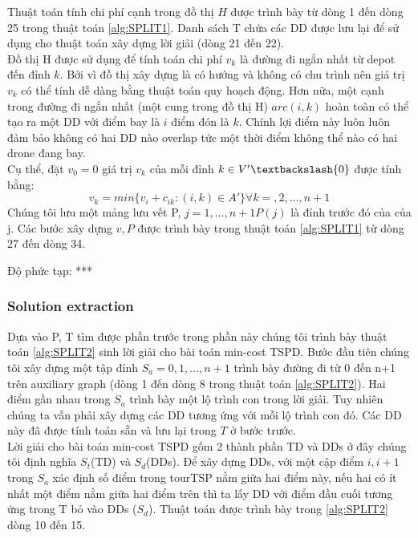 \documentclass[a4paper,12pt]{report}
\begin{document}
Thuật toán tính chi phí cạnh trong đồ thị $H$ được trình bày từ dòng 1 đến dòng 25 trong thuật toán \ref{alg:SPLIT1}. Danh sách T chứa các DD được lưu lại để sử dụng cho thuật toán xây dựng lời giải (dòng 21 đến 22). \\

Đồ thị H được sử dụng để tính toán chi phí $v_k$ là đường đi ngắn nhất từ depot đến đỉnh $k$. Bởi vì đồ thị xây dựng là có hướng và không có chu trình nên giá trị $v_k$ có thể tính dễ dàng bằng thuật toán quy hoạch động. Hơn nữa, một cạnh trong đường đi ngắn nhất (một cung trong đồ thị H) $arc(i,k)$ hoàn toàn có thể tạo ra một DD với điểm bay là $i$ điểm đón là $k$. Chính lợi điểm này luôn luôn đảm bảo không có hai DD nào overlap tức một thời điểm không thể nào có hai drone đang bay.  \\

Cụ thể, đặt $v_0=0$ giá trị $v_k$ của mỗi đỉnh $k \in V'\textbackslash \{0\}$ được tính bằng: 
$$v_k=min\{v_i+c_{ik}:(i,k) \in A'\} \forall k=,2,\ldots,n+1$$
Chúng tôi lưu một mảng lưu vết P, $j=1,\ldots,n+1 P(j) $ là đỉnh trước đó của của j. Các bước xây dựng $v,P$ được trình bày trong thuật toán \ref{alg:SPLIT1} từ dòng 27 đến dòng 34. 

Độ phức tạp: *** \\

\subsubsection{Solution extraction} 

Dựa vào P, T tìm được phần trước trong phần này chúng tôi trình bày thuật toán \ref{alg:SPLIT2} sinh lời giải cho bài toán min-cost TSPD.  Bước đầu tiên chúng tôi xây dựng một tập đỉnh $S_a=0,1,\ldots,n+1$ trình bày đường đi từ 0 đến n+1 trên auxiliary graph (dòng 1 đến dòng 8 trong thuật toán \ref{alg:SPLIT2}). Hai điểm gần nhau trong $S_a$ trình bày một lộ trình con trong lời giải. Tuy nhiên chúng ta vẫn phải xây dựng các DD tương ứng với mỗi lộ trình con đó. Các DD này đã được tính toán sẵn và lưu lại trong $T$ ở bước trước. \\

Lời giải cho bài toán min-cost TSPD gốm 2 thành phần TD và DDs ở đây chúng tôi định nghĩa $S_t$(TD) và $S_d$(DDs). Để xây dựng DDs, với một cập điểm $i,i+1$ trong $S_a$ xác định số điểm trong tourTSP nằm giữa hai điểm này, nếu hai có ít nhất một điểm nằm giữa hai điểm trên thì ta lấy DD với điểm đầu cuối tương ứng trong T bỏ vào DDs ($S_d$). Thuật toán được trình bày trong \ref{alg:SPLIT2} dòng 10 đến 15.  \\
\end{document}
